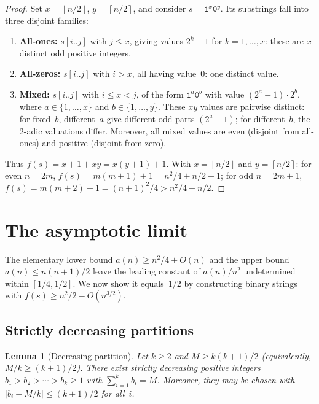 \documentclass[11pt,a4paper]{article}
\theoremstyle{plain}
\newtheorem{lemma}[theorem]{Lemma}
\theoremstyle{definition}
\theoremstyle{remark}
\newcommand{\floor}[1]{\left\lfloor #1 \right\rfloor}
\newcommand{\ceil}[1]{\left\lceil #1 \right\rceil}
\begin{document}
\begin{proof}
  Set $x = \floor{n/2}$, $y = \ceil{n/2}$, and consider
  $s = \mathtt{1}^x \mathtt{0}^y$.  Its substrings fall into three
  disjoint families:
  \begin{enumerate}[label=(\alph*)]
    \item \textbf{All-ones:} $s[i..j]$ with $j \le x$, giving values
      $2^k - 1$ for $k = 1,\ldots,x$: these are $x$ distinct odd
      positive integers.
    \item \textbf{All-zeros:} $s[i..j]$ with $i > x$, all having
      value~$0$: one distinct value.
    \item \textbf{Mixed:} $s[i..j]$ with $i \le x < j$, of the form
      $\mathtt{1}^a \mathtt{0}^b$ with value $(2^a - 1) \cdot 2^b$,
      where $a \in \{1,\ldots,x\}$ and $b \in \{1,\ldots,y\}$.
      These $xy$ values are pairwise distinct: for fixed~$b$,
      different~$a$ give different odd parts $(2^a - 1)$; for
      different~$b$, the $2$-adic valuations differ.  Moreover, all
      mixed values are even (disjoint from all-ones) and positive
      (disjoint from zero).
  \end{enumerate}
  Thus $f(s) = x + 1 + xy = x(y + 1) + 1$.  With $x = \floor{n/2}$
  and $y = \ceil{n/2}$: for even $n = 2m$,
  $f(s) = m(m+1) + 1 = n^2/4 + n/2 + 1$; for odd $n = 2m+1$,
  $f(s) = m(m+2) + 1 = (n+1)^2/4 > n^2/4 + n/2$.
\end{proof}

\section{The asymptotic limit}\label{sec:limit}

The elementary lower bound $a(n) \ge n^2/4 + O(n)$ and the upper bound
$a(n) \le n(n{+}1)/2$ leave the leading constant of $a(n)/n^2$
undetermined within $[1/4, 1/2]$.  We now show it equals~$1/2$ by
constructing binary strings with $f(s) \ge n^2/2 - O(n^{3/2})$.

\subsection{Strictly decreasing partitions}

\begin{lemma}[Decreasing partition]\label{lem:partition}
  Let $k \ge 2$ and $M \ge k(k{+}1)/2$ (equivalently,
  $M/k \ge (k{+}1)/2$).  There exist strictly
  decreasing positive integers $b_1 > b_2 > \cdots > b_k \ge 1$
  with $\sum_{i=1}^k b_i = M$.  Moreover, they may be chosen with
  $|b_i - M/k| \le (k{+}1)/2$ for all~$i$.
\end{lemma}
\end{document}
